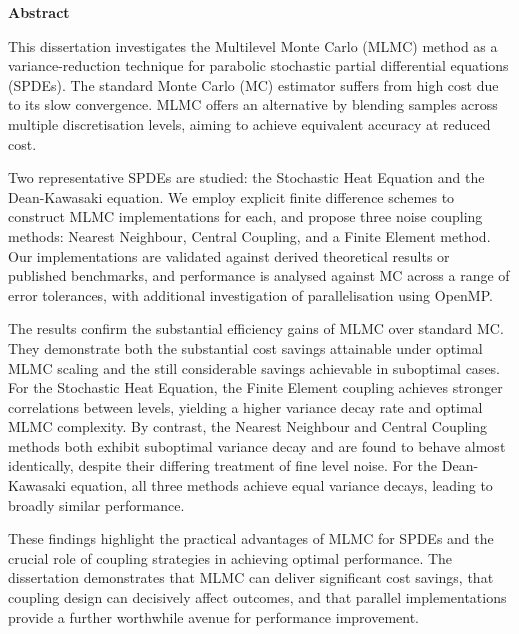\begin{center}
  \Huge\bfseries Abstract
\end{center}
\vspace{2em}

This dissertation investigates the Multilevel Monte Carlo (MLMC)
method as a variance-reduction technique for parabolic 
stochastic partial differential equations (SPDEs). The standard Monte 
Carlo (MC) estimator suffers from high cost due to its slow
convergence. MLMC offers an alternative by blending samples across 
multiple discretisation levels, aiming to achieve equivalent accuracy at 
reduced cost.

Two representative SPDEs are studied: the Stochastic Heat Equation 
and the Dean-Kawasaki equation. We employ explicit finite difference schemes 
to construct MLMC implementations for each, and propose three noise coupling 
methods: Nearest Neighbour, Central Coupling, and a Finite Element method. 
Our implementations are validated against derived theoretical results or published 
benchmarks, and performance is analysed against MC across a range of error 
tolerances, with additional investigation of parallelisation using OpenMP.

The results confirm the substantial efficiency gains of MLMC over 
standard MC. They demonstrate both the substantial cost savings attainable 
under optimal MLMC scaling and the still considerable savings achievable 
in suboptimal cases. For the Stochastic Heat Equation, the 
Finite Element coupling achieves stronger correlations 
between levels, yielding a higher variance decay rate and 
optimal MLMC complexity. By contrast, the Nearest Neighbour and Central 
Coupling methods both exhibit suboptimal variance decay and are found 
to behave almost identically, despite their differing treatment of fine level 
noise. For the Dean-Kawasaki equation, all three methods achieve 
equal variance decays, leading to broadly similar performance.

These findings highlight the practical advantages of MLMC for SPDEs and 
the crucial role of coupling strategies in achieving optimal performance. 
The dissertation demonstrates that MLMC can deliver significant cost savings, 
that coupling design can decisively affect outcomes, and that parallel 
implementations provide a further worthwhile avenue for performance 
improvement.
